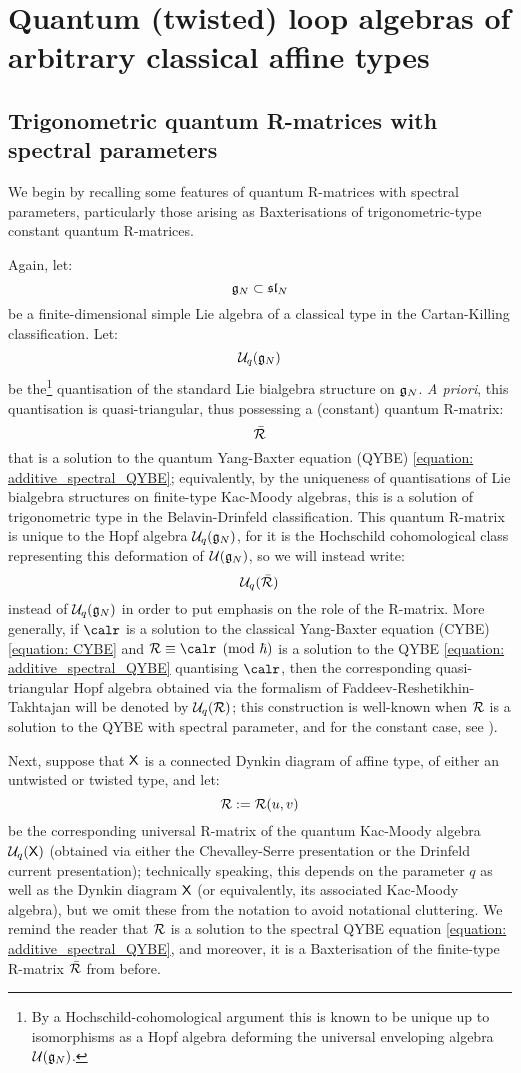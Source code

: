\section{Quantum (twisted) loop algebras of arbitrary classical affine types}
    \subsection{Trigonometric quantum R-matrices with spectral parameters}
        We begin by recalling some features of quantum R-matrices with spectral parameters, particularly those arising as Baxterisations of trigonometric-type constant quantum R-matrices. 
    
        Again, let:
            $$\mathfrak{g}_N \subset \mathfrak{sl}_N$$
        be a finite-dimensional simple Lie algebra of a classical type in the Cartan-Killing classification. Let:
            $$\mathcal{U}_q(\mathfrak{g}_N)$$
        be the\footnote{By a Hochschild-cohomological argument this is known to be unique up to isomorphisms as a Hopf algebra deforming the universal enveloping algebra $\mathcal{U}(\mathfrak{g}_N)$.} quantisation of the standard Lie bialgebra structure on $\mathfrak{g}_N$. \textit{A priori}, this quantisation is quasi-triangular, thus possessing a (constant) quantum R-matrix:
            $$\bar{\mathcal{R}}$$
        that is a solution to the quantum Yang-Baxter equation (QYBE) \eqref{equation: additive_spectral_QYBE}; equivalently, by the uniqueness of quantisations of Lie bialgebra structures on finite-type Kac-Moody algebras, this is a solution of trigonometric type in the Belavin-Drinfeld classification. This quantum R-matrix is unique to the Hopf algebra $\mathcal{U}_q(\mathfrak{g}_N)$, for it is the Hochschild cohomological class representing this deformation of $\mathcal{U}(\mathfrak{g}_N)$, so we will instead write:
            $$\mathcal{U}_q(\bar{\mathcal{R}})$$
        instead of $\mathcal{U}_q(\mathfrak{g}_N)$ in order to put emphasis on the role of the R-matrix. More generally, if $\calr$ is a solution to the classical Yang-Baxter equation (CYBE) \eqref{equation: CYBE} and $\calR \equiv \calr \pmod{\hbar}$ is a solution to the QYBE \eqref{equation: additive_spectral_QYBE} quantising $\calr$, then the corresponding quasi-triangular Hopf algebra obtained via the formalism of Faddeev-Reshetikhin-Takhtajan will be denoted by $\mathcal{U}_q(\mathcal{R})$; this construction is well-known when $\mathcal{R}$ is a solution to the QYBE with spectral parameter, and for the constant case, see \cite{gautam_rupert_wendlandt_R_matrix_presentation_for_finite_QUEs}).
    
        Next, suppose that $\mathsf{X}$ is a connected Dynkin diagram of affine type, of either an untwisted or twisted type, and let:
            $$\mathcal{R} := \mathcal{R}(u, v)$$
        be the corresponding universal R-matrix of the quantum Kac-Moody algebra $\mathcal{U}_q(\mathsf{X})$ (obtained via either the Chevalley-Serre presentation or the Drinfeld current presentation); technically speaking, this depends on the parameter $q$ as well as the Dynkin diagram $\mathsf{X}$ (or equivalently, its associated Kac-Moody algebra), but we omit these from the notation to avoid notational cluttering. We remind the reader that $\mathcal{R}$ is a solution to the spectral QYBE equation \eqref{equation: additive_spectral_QYBE}, and moreover, it is a Baxterisation of the finite-type R-matrix $\bar{\mathcal{R}}$ from before.

